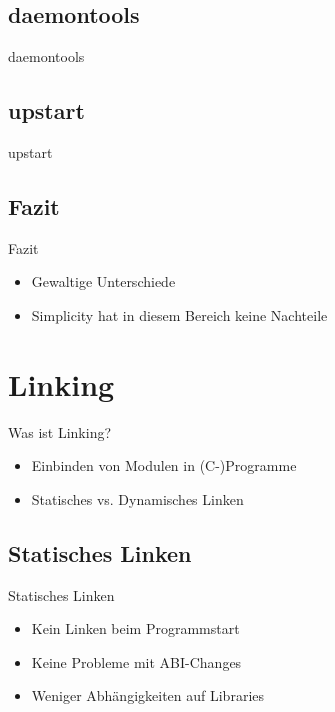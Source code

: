 \documentclass{beamer}
\begin{document}
\subsection{daemontools}
\begin{frame}{daemontools}
	
\end{frame}

\subsection{upstart}
\begin{frame}{upstart}
	
\end{frame}

\subsection{Fazit}
\begin{frame}{Fazit}
	\begin{itemize}
		\item Gewaltige Unterschiede
		\item Simplicity hat in diesem Bereich keine Nachteile
	\end{itemize}
\end{frame}

\section{Linking}
\begin{frame}{Was ist Linking?}
	\begin{itemize}
		\item Einbinden von Modulen in (C-)Programme
		\item Statisches vs. Dynamisches Linken
	\end{itemize}
\end{frame}

\subsection{Statisches Linken}
\begin{frame}{Statisches Linken}
	\begin{itemize}
		\item Kein Linken beim Programmstart
		\item Keine Probleme mit ABI-Changes
		\item Weniger Abhängigkeiten auf Libraries
	\end{itemize}
\end{frame}
\end{document}
